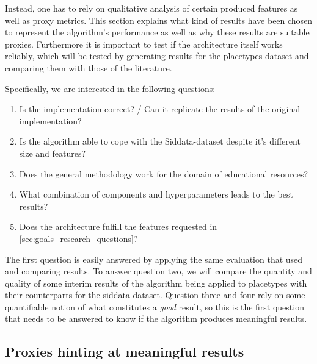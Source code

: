 Instead, one has to rely on qualitative analysis of certain produced features as well as proxy metrics. This section explains what kind of results have been chosen to represent the algorithm's performance as well as why these results are suitable proxies. Furthermore it is important to test if the architecture itself works reliably, which will be tested by generating results for the placetypes-dataset and comparing them with those of the literature.

Specifically, we are interested in the following questions:

\begin{enumerate}
	\item[\saveref{sec:results_placetypes}{1.}] Is the implementation correct? / Can it replicate the results of the original implementation?
	\item[\saveref{sec:results_datasetdiffs}{2.}] Is the algorithm able to cope with the Siddata-dataset despite it's different size and features?
	\item[\saveref{sec:results_siddata}{3.}] Does the general methodology work for the domain of educational resources?
	\item[\saveref{sec:results_params}{4.}] What combination of components and hyperparameters leads to the best results?
	\item[\saveref{sec:results_architecture}{5.}] Does the architecture fulfill the features requested in \autoref{sec:goals_research_questions}?
\end{enumerate}

The first question is easily answered by applying the same evaluation that \mainalgos used and comparing results. To answer question two, we will compare the quantity and quality of some interim results of the algorithm being applied to placetypes with their counterparts for the siddata-dataset. Question three and four rely on some quantifiable notion of what constitutes a \emph{good} result, so this is the first question that needs to be answered to know if the algorithm produces meaningful results.

\subsection{Proxies hinting at meaningful results}

